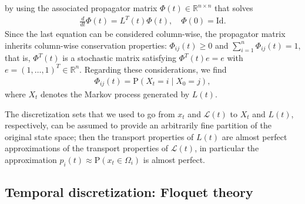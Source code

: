 \documentclass[aps, pre, preprint,unsortedaddress,a4paper,onecolumn]{revtex4}
\newcommand{\vect}[1]{#1}
\newcommand{\ml}[0]{\mathcal {L}}
\newcommand{\id}{\mathrm{Id}}
\newcommand{\myphi}{\Phi}
\newcommand{\prob}{\textrm{P}}
\begin{document}
by using the
associated propagator matrix $\myphi(t)\in\mathbb R^{n\times n}$ that solves
\begin{align}
  \label{eq:disc-master-phi}
  \frac{d}{dt}\myphi(t) = \vect L^T(t)\myphi(t), \quad \myphi(0) = \id .
\end{align}
Since the last equation can be considered column-wise, the propagator matrix inherits column-wise conservation properties:
$\Phi_{ij}(t) \ge  0$
and $\sum\limits_{i=1}^n \Phi_{ij}(t)  =  1$,
that is, $\myphi^T(t)$ is a
stochastic matrix satisfying $\myphi^T(t)\vect e=\vect e$
with $\vect e=(1,\ldots,1)^T\in \mathbb R^n$.
Regarding these considerations, we find
\begin{align}
\label{eq:disc-10}  
\myphi_{ij}(t)=\prob\left(\vect X_t=i\mid \vect X_0=j \right),
\end{align}
where $\vect X_t$ denotes the Markov process generated by $\vect L(t)$.
 
The discretization sets that we used to go from $\vect x_t$ and $\ml(t)$ to $\vect X_t$
and $\vect L(t)$, respectively, can be assumed to provide an arbitrarily fine
partition of the original state space; then the transport properties
of $\vect L(t)$ are almost perfect approximations of the transport properties
of $\ml(t)$, in particular the approximation $p_i(t)\approx \prob(x_t\in \Omega_i)$ is almost perfect.

\subsection{Temporal discretization: Floquet theory}
\label{sec:floquet}
\end{document}
